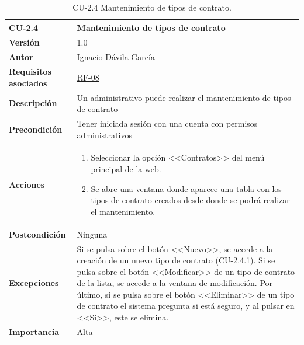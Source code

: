 \begin{table}[p]
\label{table:CU-2.4}
	\centering
	\begin{tabularx}{\linewidth}{ p{} p{} }
		\toprule
		\textbf{CU-2.4}    & \textbf{Mantenimiento de tipos de contrato}\\
		\toprule
		\textbf{Versión}              & 1.0    \\
		\textbf{Autor}                & Ignacio Dávila García \\
		\textbf{Requisitos asociados} & \hyperref[itm:RF8]{RF-08} \\
		\textbf{Descripción}          & Un administrativo puede realizar el mantenimiento de tipos de contrato \\
		\textbf{Precondición}         & Tener iniciada sesión con una cuenta con permisos administrativos \\
		\textbf{Acciones}             &
		\begin{enumerate}
			\def\labelenumi{\arabic{enumi}.}
			\tightlist
			\item Seleccionar la opción <<Contratos>> del menú principal de la web.
			\item Se abre una ventana donde aparece una tabla con los tipos de contrato creados desde donde se podrá realizar el mantenimiento.
		\end{enumerate}\\
		\textbf{Postcondición}        & Ninguna \\
		\textbf{Excepciones}          & Si se pulsa sobre el botón <<Nuevo>>, se accede a la creación de un nuevo tipo de contrato (\hyperref[table:CU-2.4.1]{CU-2.4.1}). Si se pulsa sobre el botón <<Modificar>> de un tipo de contrato de la lista, se accede a la ventana de modificación. Por último, si se pulsa sobre el botón <<Eliminar>> de un tipo de contrato el sistema pregunta si está seguro, y al pulsar en <<Sí>>, este se elimina. \\
		\textbf{Importancia}          & Alta \\
		\bottomrule
	\end{tabularx}
	\caption{CU-2.4 Mantenimiento de tipos de contrato.}
\end{table}
\FloatBarrier


